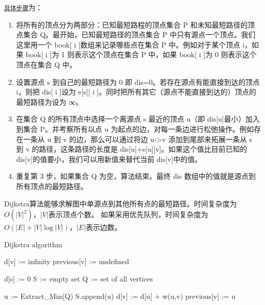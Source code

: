 \href{http://wiki.jikexueyuan.com/project/easy-learn-algorithm/dijkstra.html}{\texttt{具体步骤}}为：
\begin{enumerate}
\item 将所有的顶点分为两部分：已知最短路程的顶点集合 P 和未知最短路径的顶点集合 Q。最开始，已知最短路径的顶点集合 P 中只有源点一个顶点。我们这里用一个 book[ i ]数组来记录哪些点在集合 P 中。例如对于某个顶点 i，如果 book[ i ]为 1 则表示这个顶点在集合 P 中，如果 book[ i ]为 0 则表示这个顶点在集合 Q 中。
\item 设置源点 s 到自己的最短路径为 0 即 dis=0。若存在源点有能直接到达的顶点 i，则把 dis[ i ]设为 e[s][ i ]。同时把所有其它（源点不能直接到达的）顶点的最短路径为设为 ∞。
\item 在集合 Q 的所有顶点中选择一个离源点 s 最近的顶点 u（即 dis[u]最小）加入到集合 P。并考察所有以点 u 为起点的边，对每一条边进行松弛操作。例如存在一条从 u 到 v 的边，那么可以通过将边 u->v 添加到尾部来拓展一条从 s 到 v 的路径，这条路径的长度是 dis[u]+e[u][v]。如果这个值比目前已知的 dis[v]的值要小，我们可以用新值来替代当前 dis[v]中的值。
\item 重复第 3 步，如果集合 Q 为空，算法结束。最终 dis 数组中的值就是源点到所有顶点的最短路径。
\end{enumerate}

Dijkstra算法能够求解图中单源点到其他所有点的最短路径。时间复杂度为$O(|V|^2)$，$|V|$表示顶点个数。
如果采用优先队列，时间复杂度为$O(|E|+|V|\log|V|)$，$|E|$表示边数。


\begin{algorithm}[h] \caption{Dijkstra algorithm} 
\begin{algorithmic}[1] 
\STATE d[v] := infinity
\STATE previous[v] := undefined
\ENDFOR

\STATE d[s] := 0      
\STATE S := empty set
\STATE Q := set of all vertices

\STATE u := Extract_Min(Q)
\STATE S.append(u)
\STATE d[v] := d[u] + w(u,v)
\STATE previous[v] := u
\ENDIF
\ENDFOR
\ENDWHILE

\end{algorithmic} \end{algorithm}


